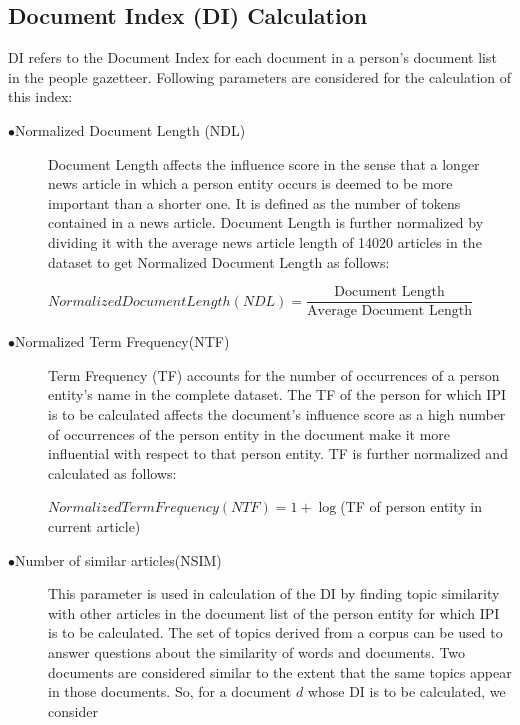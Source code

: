 \subsection{Document Index (DI) Calculation}

DI refers to the Document Index for each document in a person's document list in the people gazetteer. Following parameters are considered for the calculation of this index:

\begin{description}
\item[$\bullet$Normalized Document Length (NDL)]
Document Length affects the influence score in the sense that a longer news article in which a person entity occurs is deemed to be more important than a shorter one. It is defined as the number of tokens contained in a news article. Document Length is further normalized by dividing it with the average news article length of 14020 articles in the dataset to get Normalized Document Length as follows: 

$Normalized Document Length (NDL)=\dfrac{\text{Document Length}} {\text{Average Document Length}}$



\item[$\bullet$Normalized Term Frequency(NTF)]
Term Frequency (TF) accounts for the number of occurrences of a person entity's name in the complete dataset. The TF of the person for which IPI is to be calculated affects the document's influence score as a high number of occurrences of the person entity in the document make it more influential with respect to that person entity. TF is further normalized and calculated as follows:

$Normalized Term Frequency (NTF)=	1	+\log	$(TF of person entity in current article)


\item[$\bullet$Number of similar articles(NSIM)]
This parameter is used in calculation of the DI by finding topic similarity with other articles  in the document list of the person entity for which IPI is to be calculated. 
The set of topics derived from a corpus can be used to answer questions about the similarity of words and 
documents. Two documents are considered similar to the extent that the same topics appear in those documents. So, for a document $d$ whose DI is to be calculated, we consider 


\end{description}
